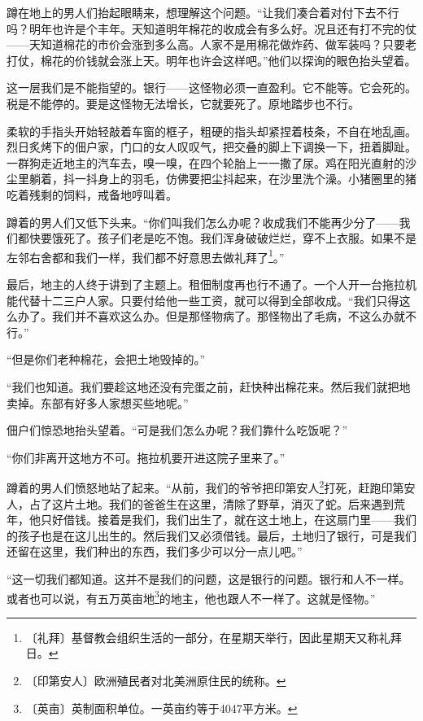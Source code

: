 \documentclass[12pt,UTF-8,openany]{ctexbook}
\begin{document}
\begin{normalsize}
    蹲在地上的男人们抬起眼睛来，想理解这个问题。“让我们凑合着对付下去不行吗？明年也许是个丰年。天知道明年棉花的收成会有多么好。况且还有打不完的仗——天知道棉花的市价会涨到多么高。人家不是用棉花做炸药、做军装吗？只要老打仗，棉花的价钱就会涨上天。明年也许会这样吧。”他们以探询的眼色抬头望着。
    
    这一层我们是不能指望的。银行——这怪物必须一直盈利。它不能等。它会死的。税是不能停的。要是这怪物无法增长，它就要死了。原地踏步也不行。
    
    柔软的手指头开始轻敲着车窗的框子，粗硬的指头却紧捏着枝条，不自在地乱画。烈日炙烤下的佃户家，门口的女人叹叹气，把交叠的脚上下调换一下，扭着脚趾。一群狗走近地主的汽车去，嗅一嗅，在四个轮胎上一一撒了尿。鸡在阳光直射的沙尘里躺着，抖一抖身上的羽毛，仿佛要把尘抖起来，在沙里洗个澡。小猪圈里的猪吃着残剩的饲料，戒备地哼叫着。
    
    蹲着的男人们又低下头来。“你们叫我们怎么办呢？收成我们不能再少分了——我们都快要饿死了。孩子们老是吃不饱。我们浑身破破烂烂，穿不上衣服。如果不是左邻右舍都和我们一样，我们都不好意思去做礼拜了\footnote{〔礼拜〕基督教会组织生活的一部分，在星期天举行，因此星期天又称礼拜日。}。”
    
    最后，地主的人终于讲到了主题上。租佃制度再也行不通了。一个人开一台拖拉机能代替十二三户人家。只要付给他一些工资，就可以得到全部收成。“我们只得这么办了。我们并不喜欢这么办。但是那怪物病了。那怪物出了毛病，不这么办就不行。”
    
    “但是你们老种棉花，会把土地毁掉的。”
    
    “我们也知道。我们要趁这地还没有完蛋之前，赶快种出棉花来。然后我们就把地卖掉。东部有好多人家想买些地呢。”
    
    佃户们惊恐地抬头望着。“可是我们怎么办呢？我们靠什么吃饭呢？”
    
    “你们非离开这地方不可。拖拉机要开进这院子里来了。”
    
    蹲着的男人们愤怒地站了起来。“从前，我们的爷爷把印第安人\footnote{〔印第安人〕欧洲殖民者对北美洲原住民的统称。}打死，赶跑印第安人，占了这片土地。我们的爸爸生在这里，清除了野草，消灭了蛇。后来遇到荒年，他只好借钱。接着是我们，我们出生了，就在这土地上，在这扇门里——我们的孩子也是在这儿出生的。然后我们又必须借钱。最后，土地归了银行，可是我们还留在这里，我们种出的东西，我们多少可以分一点儿吧。”
    
    “这一切我们都知道。这并不是我们的问题，这是银行的问题。银行和人不一样。或者也可以说，有五万英亩地\footnote{〔英亩〕英制面积单位。一英亩约等于4047平方米。}的地主，他也跟人不一样了。这就是怪物。”
    

\end{normalsize}
\end{document}
